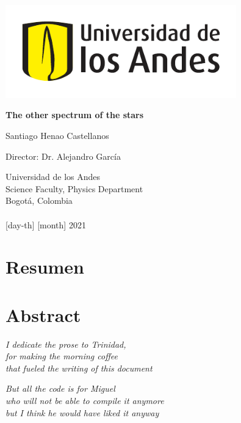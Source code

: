 \documentclass[12pt,letterpaper,oneside]{book}
\begin{document}
	\begin{titlepage}
		\begin{center}
			\includegraphics[width=10cm]{img/logo-uniandes.pdf}
			
			\vspace{2cm}
			
			{\fontsize{25}{40}\selectfont \bf The other spectrum of the stars\par}
			
			\vspace{10mm}
			
			{\huge Santiago Henao Castellanos}
			
			\vspace{10mm}
			
			{\huge Director: Dr. Alejandro García } 
			
			\vspace{15mm}
			
			{\Large
				Universidad de los Andes\\
				Science Faculty, Physics Department\\
				Bogotá, Colombia\\ \phantom{} \\
				{[day-th]} {[month]} 2021
			}
		\end{center}
	\end{titlepage}

\frontmatter

\chapter*{Resumen}

\chapter*{Abstract}

\newpage

\begin{flushright}
	\textit{
		I dedicate the prose to Trinidad,        \\
		for making the morning coffee            \\ 
		that fueled the writing of this document
	}

	\vspace{5mm}

	\textit{
		But all the code is for Miguel             \\
		who will not be able to compile it anymore \\ 
		but I think he would have liked it anyway
	}
\end{flushright}
\end{document}
